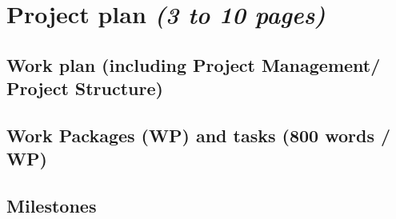 \documentclass[11pt,twoside,a4paper]{article}
\begin{document}
\section{Project plan {\small \emph{(3 to 10 pages)}}}

\subsection{Work plan {\small (including Project Management/ Project
    Structure)}} 


\subsection{Work Packages (WP) and tasks (800 words / WP)}

% 
% 
% 
% 
% 
% 



\subsection{Milestones}
\label{sub:milestones}
\end{document}

